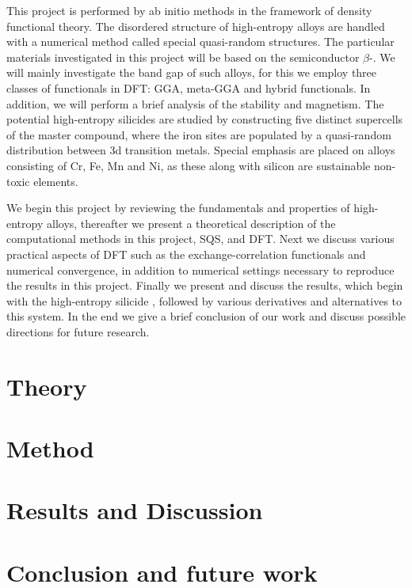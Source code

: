 \documentclass[UKenglish]{ifimaster}  %
\begin{document}
This project is performed by ab initio methods in the framework of density functional theory. The disordered structure of high-entropy alloys are handled with a numerical method called special quasi-random structures. The particular materials investigated in this project will be based on the semiconductor $\beta$-. We will mainly investigate the band gap of such alloys, for this we employ three classes of functionals in DFT: GGA, meta-GGA and hybrid functionals. In addition, we will perform a brief analysis of the stability and magnetism. The potential high-entropy silicides are studied by  constructing five distinct supercells of the master compound, where the iron sites are populated by a quasi-random distribution between 3d transition metals. Special emphasis are placed on alloys consisting of Cr, Fe, Mn and Ni, as these along with silicon are sustainable non-toxic elements.  

We begin this project by reviewing the fundamentals and properties of high-entropy alloys, thereafter we present a theoretical description of the computational methods in this project, SQS, and DFT. Next we discuss various practical aspects of DFT such as the exchange-correlation functionals and numerical convergence, in addition to numerical settings necessary to reproduce the results in this project. Finally we present and discuss the results, which begin with the high-entropy silicide , followed by various derivatives and alternatives to this system.  In the end we give a brief conclusion of our work and discuss possible directions for future research.


\part{Theory}                    %




\part{Method}


 
\part{Results and Discussion}




\part{Conclusion and future work}
\end{document}
